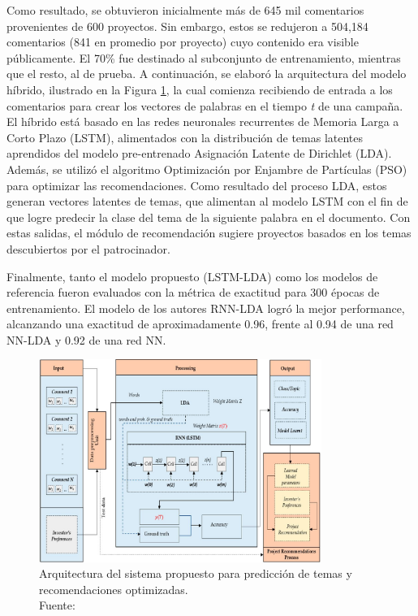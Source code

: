 Como resultado, se obtuvieron inicialmente más de 645 mil comentarios provenientes de 600 proyectos. Sin embargo, estos se redujeron a 504,184 comentarios (841 en promedio por proyecto) cuyo contenido era visible públicamente. El 70\% fue destinado al subconjunto de entrenamiento, mientras que el resto, al de prueba. A continuación, se elaboró la arquitectura del modelo híbrido, ilustrado en la Figura \ref{2:fig128}, la cual comienza recibiendo de entrada a los comentarios para crear los vectores de palabras en el tiempo \textit{t} de una campaña. El híbrido está basado en las redes neuronales recurrentes de Memoria Larga a Corto Plazo (LSTM), alimentados con la distribución de temas latentes aprendidos del modelo pre-entrenado Asignación Latente de Dirichlet (LDA). Además, se utilizó el algoritmo Optimización por Enjambre de Partículas (PSO) para optimizar las recomendaciones. Como resultado del proceso LDA, estos generan vectores latentes de temas, que alimentan al modelo LSTM con el fin de que logre predecir la clase del tema de la siguiente palabra en el documento. Con estas salidas, el módulo de recomendación sugiere proyectos basados en los temas descubiertos por el patrocinador.

Finalmente, tanto el modelo propuesto (LSTM-LDA) como los modelos de referencia fueron evaluados con la métrica de exactitud para 300 épocas de entrenamiento. El modelo de los autores RNN-LDA logró la mejor performance, alcanzando una exactitud de aproximadamente 0.96, frente al 0.94 de una red NN-LDA y 0.92 de una red NN.

\begin{figure}[!ht]
	\begin{center}
		\includegraphics[width=0.82\textwidth]{2/figures/shafqat2019.jpg}
		\caption[Arquitectura del sistema propuesto para predicción de temas y recomendaciones optimizadas]{Arquitectura del sistema propuesto para predicción de temas y recomendaciones optimizadas.\\
		Fuente: \cite{pr_shafqat2019topicpredictions}}
		\label{2:fig128}
	\end{center}
\end{figure}

